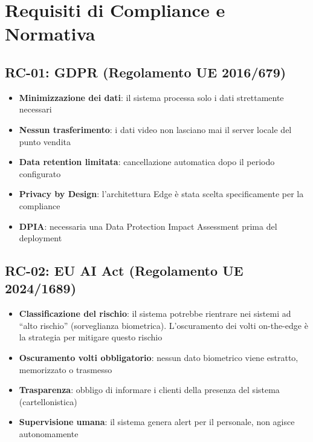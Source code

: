 \documentclass[a4paper, 12pt]{article}
\begin{document}
\section{Requisiti di Compliance e Normativa}

\subsection{RC-01: GDPR (Regolamento UE 2016/679)}

\begin{itemize}
    \item \textbf{Minimizzazione dei dati}: il sistema processa solo i dati strettamente necessari
    \item \textbf{Nessun trasferimento}: i dati video non lasciano mai il server locale del punto vendita
    \item \textbf{Data retention limitata}: cancellazione automatica dopo il periodo configurato
    \item \textbf{Privacy by Design}: l'architettura Edge è stata scelta specificamente per la compliance
    \item \textbf{DPIA}: necessaria una Data Protection Impact Assessment prima del deployment
\end{itemize}

\subsection{RC-02: EU AI Act (Regolamento UE 2024/1689)}

\begin{itemize}
    \item \textbf{Classificazione del rischio}: il sistema potrebbe rientrare nei sistemi ad ``alto rischio'' (sorveglianza biometrica). L'oscuramento dei volti on-the-edge è la strategia per mitigare questo rischio
    \item \textbf{Oscuramento volti obbligatorio}: nessun dato biometrico viene estratto, memorizzato o trasmesso
    \item \textbf{Trasparenza}: obbligo di informare i clienti della presenza del sistema (cartellonistica)
    \item \textbf{Supervisione umana}: il sistema genera alert per il personale, non agisce autonomamente
\end{itemize}
\end{document}
